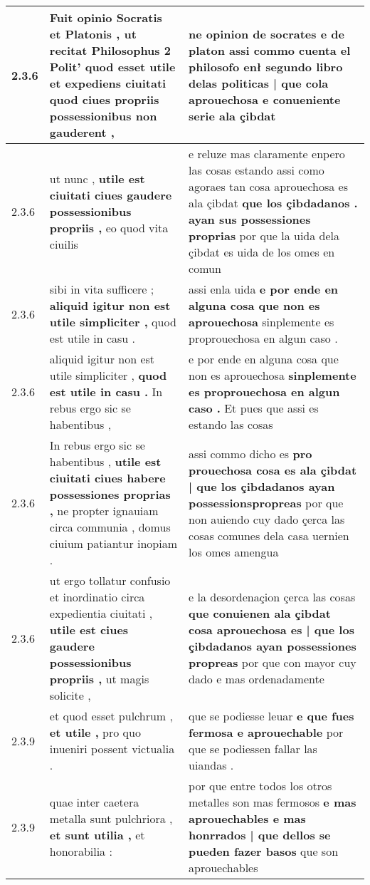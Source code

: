 \begin{tabular}{|p{1cm}|p{6.5cm}|p{6.5cm}|}
2.3.6 & Fuit opinio Socratis et Platonis , \textbf{ ut recitat Philosophus 2 Polit’ quod esset utile } et expediens ciuitati quod ciues propriis possessionibus non gauderent , & ne opinion de socrates e de platon \textbf{ assi commo cuenta el philosofo enł segundo libro delas politicas | que cola aprouechosa } e conueniente serie ala çibdat \\\hline
2.3.6 & ut nunc , \textbf{ utile est ciuitati ciues gaudere possessionibus propriis , } eo quod vita ciuilis & e reluze mas claramente enpero las cosas estando assi como agoraes tan cosa aprouechosa es ala çibdat \textbf{ que los çibdadanos . ayan sus possessiones proprias } por que la uida dela çibdat es uida de los omes en comun \\\hline
2.3.6 & sibi in vita sufficere ; \textbf{ aliquid igitur non est utile simpliciter , } quod est utile in casu . & assi enla uida \textbf{ e por ende en alguna cosa que non es aprouechosa } sinplemente es proprouechosa en algun caso . \\\hline
2.3.6 & aliquid igitur non est utile simpliciter , \textbf{ quod est utile in casu . } In rebus ergo sic se habentibus , & e por ende en alguna cosa que non es aprouechosa \textbf{ sinplemente es proprouechosa en algun caso . } Et pues que assi es estando las cosas \\\hline
2.3.6 & In rebus ergo sic se habentibus , \textbf{ utile est ciuitati ciues habere possessiones proprias , } ne propter ignauiam circa communia , domus ciuium patiantur inopiam . & assi commo dicho es \textbf{ pro prouechosa cosa es ala çibdat | que los çibdadanos ayan possessionspropreas } por que non auiendo cuy dado çerca las cosas comunes dela casa uernien los omes amengua \\\hline
2.3.6 & ut ergo tollatur confusio et inordinatio circa expedientia ciuitati , \textbf{ utile est ciues gaudere possessionibus propriis , } ut magis solicite , & e la desordenaçion çerca las cosas \textbf{ que conuienen ala çibdat cosa aprouechosa es | que los çibdadanos ayan possessiones propreas } por que con mayor cuy dado e mas ordenadamente \\\hline
2.3.9 & et quod esset pulchrum , \textbf{ et utile , } pro quo inueniri possent victualia . & que se podiesse leuar \textbf{ e que fues fermosa e aprouechable } por que se podiessen fallar las uiandas . \\\hline
2.3.9 & quae inter caetera metalla sunt pulchriora , \textbf{ et sunt utilia , } et honorabilia : & por que entre todos los otros metalles son mas fermosos \textbf{ e mas aprouechables e mas honrrados | que dellos se pueden fazer basos } que son aprouechables \\\hline

\end{tabular}
